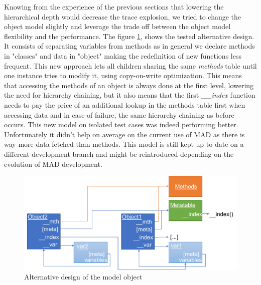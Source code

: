 
Knowing from the experience of the previous sections that lowering the
hierarchical depth would decrease the trace explosion, we tried to change the
object model slightly and leverage the trade off between the object model
flexibility and the performance. The figure \ref{fig:MO-alt-desc}, shows the tested
alternative design. It consists of separating variables from methods as in
general we declare methods in "classes" and data in "object" making the
redefinition of new functions less frequent. This new approach lets all children
sharing the same \emph{methods} table until one instance tries to modify it,
using copy-on-write optimization. This means that accessing the methods of an
object is always done at the first level, lowering the need for hierarchy
chaining, but it also means that the first \emph{\_\_index} function needs to
pay the price of an additional lookup in the methods table first when accessing
data and in case of failure, the same hierarchy chaining as before occurs. This new
model on isolated test cases was
indeed performing better. Unfortunately it didn't help on average on the current
use of MAD as there is way more data fetched than methods. This model is still
kept up to date on a different development branch and might be reintroduced
depending on the evolution of MAD development.

\begin{figure}
    \centering
    \includegraphics[width=\textwidth]{./Images/MO2.pdf}
    \caption{Alternative design of the model object}
    \label{fig:MO-alt-desc}
\end{figure}
